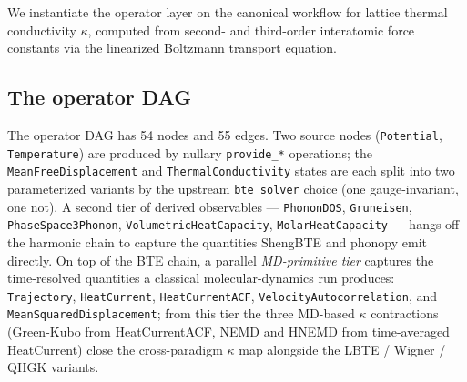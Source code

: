 \documentclass[11pt,a4paper]{article}
\begin{document}
We instantiate the operator layer on the canonical workflow for lattice thermal conductivity $\kappa$,
computed from second- and third-order interatomic force constants via the linearized Boltzmann
transport equation.

\subsection{The operator DAG}

The operator DAG has 54 nodes and 55 edges. Two source nodes (\texttt{Potential},
\texttt{Temperature}) are produced by nullary \texttt{provide\_*} operations; the
\texttt{MeanFreeDisplacement} and \texttt{ThermalConductivity} states are each split
into two parameterized variants by the upstream \texttt{bte\_solver} choice (one
gauge-invariant, one not). A second tier of derived observables ---
\texttt{PhononDOS}, \texttt{Gruneisen}, \texttt{PhaseSpace3Phonon},
\texttt{VolumetricHeatCapacity}, \texttt{MolarHeatCapacity} --- hangs off the
harmonic chain to capture the quantities ShengBTE and phonopy emit directly.
On top of the BTE chain, a parallel \emph{MD-primitive tier} captures the
time-resolved quantities a classical molecular-dynamics run produces:
\texttt{Trajectory}, \texttt{HeatCurrent}, \texttt{HeatCurrentACF},
\texttt{VelocityAutocorrelation}, and \texttt{MeanSquaredDisplacement}; from this
tier the three MD-based $\kappa$ contractions (Green-Kubo from HeatCurrentACF,
NEMD and HNEMD from time-averaged HeatCurrent) close the cross-paradigm
$\kappa$ map alongside the LBTE / Wigner / QHGK variants.
\end{document}
